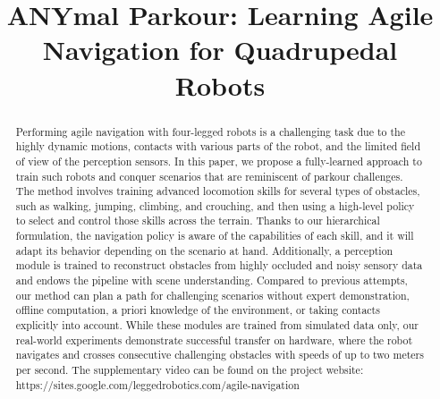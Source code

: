 \documentclass[conference]{IEEEtran}
\begin{document}
\title{ANYmal Parkour: Learning Agile Navigation for Quadrupedal Robots} 

\author{
    \and
    \and
    \and
}

\maketitle

\begin{abstract}
Performing agile navigation with four-legged robots is a challenging task due to the highly dynamic motions, contacts with various parts of the robot, and the limited field of view of the perception sensors. 
In this paper, we propose a fully-learned approach to train such robots and conquer scenarios that are reminiscent of parkour challenges. The method involves training advanced locomotion skills for several types of obstacles, such as walking, jumping, climbing, and crouching, and then using a high-level policy to select and control those skills across the terrain. Thanks to our hierarchical formulation, the navigation policy is aware of the capabilities of each skill, and it will adapt its behavior depending on the scenario at hand. Additionally, a perception module is trained to reconstruct obstacles from highly occluded and noisy sensory data and endows the pipeline with scene understanding. 
Compared to previous attempts, our method can plan a path for challenging scenarios without expert demonstration, offline computation, a priori knowledge of the environment, or taking contacts explicitly into account.
While these modules are trained from simulated data only, our real-world experiments demonstrate successful transfer on hardware, where the robot navigates and crosses consecutive challenging obstacles with speeds of up to two meters per second. The supplementary video can be found on the project website: https://sites.google.com/leggedrobotics.com/agile-navigation
\end{abstract}
\end{document}
